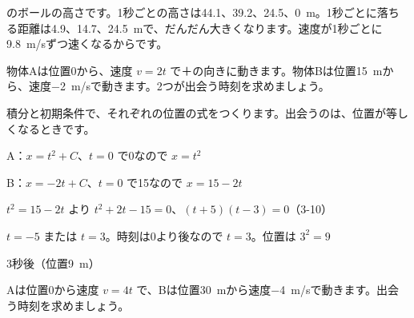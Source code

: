 \noindent\begin{minipage}[c]{0.48\linewidth}
\end{minipage}\hfill
\begin{minipage}[c]{0.5\linewidth}\raggedright
{}のボールの高さです。1秒ごとの高さは44.1、39.2、24.5、\qty{0}{m}。1秒ごとに落ちる距離は4.9、14.7、\qty{24.5}{m}で、だんだん大きくなります。速度が1秒ごとに\qty{9.8}{m/s}ずつ速くなるからです。
\end{minipage}

\begin{reidai}[2つの物体が出会う時刻]
物体Aは位置0から、速度 $v=2t$ で＋の向きに動きます。物体Bは位置\qty{15}{m}から、速度\qty{-2}{m/s}で動きます。2つが出会う時刻を求めましょう。\par
\kangaekata 積分と初期条件で、それぞれの位置の式をつくります。出会うのは、位置が等しくなるときです。\par
\shiki A：$x=t^2+C$、$t=0$ で0なので $x=t^2$\par
\hspace*{2.6\zw}B：$x=-2t+C$、$t=0$ で15なので $x=15-2t$\par
\hspace*{2.6\zw}$t^2=15-2t$ より $t^2+2t-15=0$、$(t+5)(t-3)=0$（3-10）\par
\hspace*{2.6\zw}$t=-5$ または $t=3$。時刻は0より後なので $t=3$。位置は $3^2=9$\par
\kotae 3秒後（位置\qty{9}{m}）
\end{reidai}

\begin{jibun}
Aは位置0から速度 $v=4t$ で、Bは位置\qty{30}{m}から速度\qty{-4}{m/s}で動きます。出会う時刻を求めましょう。
\end{jibun}

